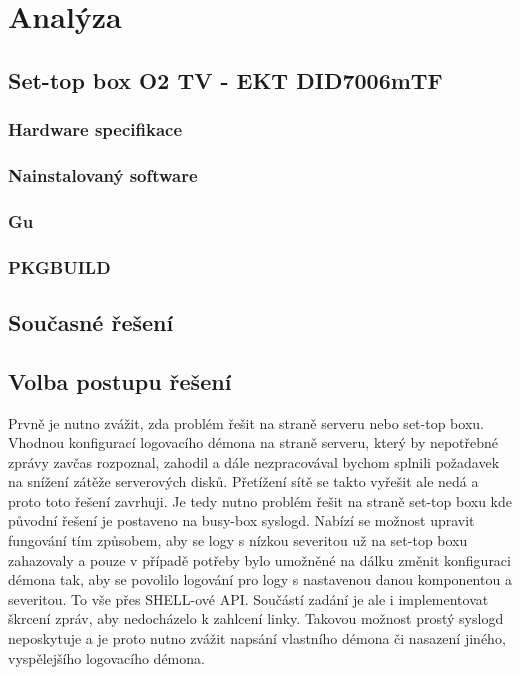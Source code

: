 \documentclass[thesis=B,czech]{FITthesis}[2012/06/26]
\begin{document}
\chapter{Analýza}

\section{Set-top box O2 TV - EKT DID7006mTF}
\subsection*{Hardware specifikace}
\subsection*{Nainstalovaný software}
\subsection*{Gu}
\subsection*{PKGBUILD}

\section{Současné řešení}

\section{Volba postupu řešení}
Prvně je nutno zvážit, zda problém řešit na straně serveru nebo set-top boxu. Vhodnou konfigurací logovacího démona na straně serveru, který by nepotřebné zprávy zavčas rozpoznal, zahodil a dále nezpracovával bychom splnili požadavek na snížení zátěže serverových disků. Přetížení sítě se takto vyřešit ale nedá a proto toto řešení zavrhuji.
Je tedy nutno problém řešit na straně set-top boxu kde původní řešení je postaveno na busy-box syslogd. Nabízí se možnost upravit fungování tím způsobem, aby se logy s nízkou severitou už na set-top boxu zahazovaly a pouze v případě potřeby bylo umožněné na dálku změnit konfiguraci démona tak, aby se povolilo logování pro logy s nastavenou danou komponentou a severitou. To vše přes SHELL-ové API.
Součástí zadání je ale i implementovat škrcení zpráv, aby nedocházelo k zahlcení linky. Takovou možnost prostý syslogd neposkytuje a je proto nutno zvážit napsání vlastního démona či nasazení jiného, vyspělejšího logovacího démona.
\end{document}
